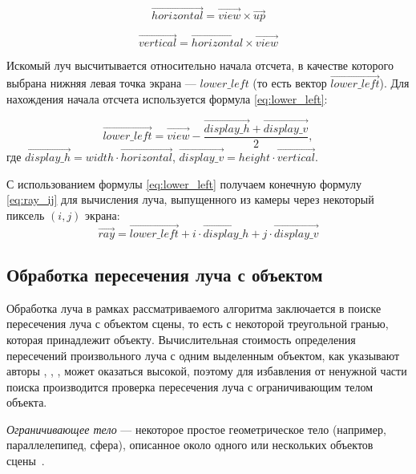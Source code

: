 \begin{equation}\label{eq:horizontal}
	\overrightarrow{horizontal} = \overrightarrow{view} \times \overrightarrow{up}
\end{equation}

\begin{equation}\label{eq:vertical}
	\overrightarrow{vertical} = \overrightarrow{horizontal} \times \overrightarrow{view}
\end{equation}

Искомый луч высчитывается относительно начала отсчета, в качестве которого выбрана нижняя левая точка экрана --- $lower\_left$ (то есть вектор $\overrightarrow{lower\_left}$).
Для нахождения начала отсчета используется формула \ref{eq:lower_left}:

\begin{equation}\label{eq:lower_left}
	\overrightarrow{lower\_left} = \overrightarrow{view} - \frac{\overrightarrow{display\_h} + \overrightarrow{display\_v}}{2},
\end{equation}
где $\overrightarrow{display\_h} = width \cdot \overrightarrow{horizontal}$, $\overrightarrow{display\_v} = height \cdot \overrightarrow{vertical}$.

С использованием формулы \ref{eq:lower_left} получаем конечную формулу \ref{eq:ray_ij} для вычисления луча, выпущенного из камеры через некоторый пиксель $(i, j)$ экрана:
\begin{equation}\label{eq:ray_ij}
	\overrightarrow{ray} = \overrightarrow{lower\_left} + i \cdot \overrightarrow{display\_h} + j \cdot \overrightarrow{display\_v}
\end{equation}

\subsection{Обработка пересечения луча с объектом}

Обработка луча в рамках рассматриваемого алгоритма заключается в поиске пересечения луча с объектом сцены, то есть с некоторой треугольной гранью, которая принадлежит объекту.
Вычислительная стоимость определения пересечений произвольного луча с одним выделенным объектом, как указывают авторы \cite{божко2007компьютерная}, \cite{роджерс}, \cite{боресков}, может оказаться высокой, поэтому для избавления от ненужной части поиска производится проверка пересечения луча с ограничивающим телом объекта.

\textit{Ограничивающее тело} --- некоторое простое геометрическое тело (например, параллелепипед, сфера), описанное около одного или нескольких объектов сцены~\cite{боресков}.

